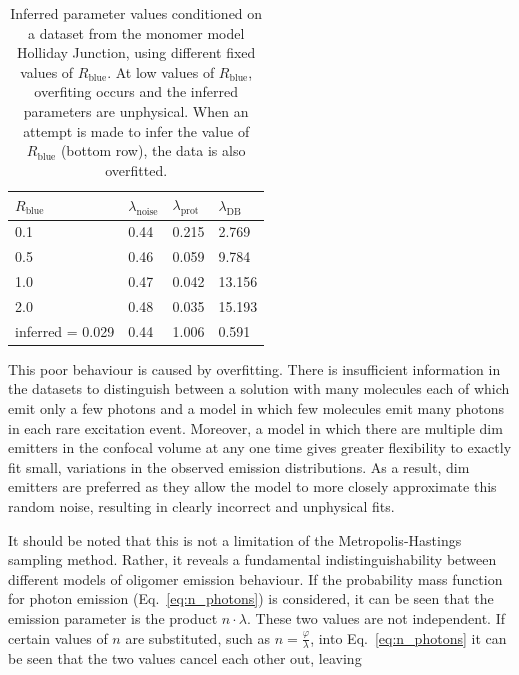 \begin{center}
\begin{table}
\caption{Inferred parameter values conditioned on a dataset from the monomer model Holliday Junction, using different fixed values of $R_{\text{blue}}$. At low values of $R_{\text{blue}}$, overfiting occurs and the inferred parameters are unphysical. When an attempt is made to infer the value of $R_{\text{blue}}$ (bottom row), the data is also overfitted.}
\begin{tabular}{|l|l|l|l|}
\hline
{\bf $R_{\text{blue}}$} & {\bf $\lambda_{\text{noise}}$} & {\bf $\lambda_{\text{prot}}$} & {\bf $\lambda_{\text{DB}}$}\\ \hline
0.1 & 0.44 & 0.215 & 2.769 \\
0.5 & 0.46 & 0.059 & 9.784 \\
1.0 & 0.47 & 0.042 & 13.156 \\
2.0 & 0.48	& 0.035	& 15.193 \\
inferred = 0.029 & 0.44 & 1.006 & 0.591\\ \hline
\end{tabular}
\label{tab:R_blue}
\end{table}
\end{center}

This poor behaviour is caused by overfitting. There is insufficient information in the datasets to distinguish between a solution with many molecules each of which emit only a few photons and a model in which few molecules emit many photons in each rare excitation event. Moreover, a model in which there are multiple dim emitters in the confocal volume at any one time gives greater flexibility to exactly fit small, variations in the observed emission distributions. As a result, dim emitters are preferred as they allow the model to more closely approximate this random noise, resulting in clearly incorrect  and unphysical fits.

It should be noted that this is not a limitation of the Metropolis-Hastings sampling method. Rather, it reveals a fundamental indistinguishability between different models of oligomer emission behaviour. If the probability mass function for photon emission (Eq.~\ref{eq:n_photons}) is considered, it can be seen that the emission parameter is the product $n \cdot \lambda$. These two values are not independent. If certain values of $n$ are substituted, such as $n = \frac{\varphi}{\lambda}$, into Eq.~\ref{eq:n_photons} it can be seen that the two values cancel each other out, leaving

